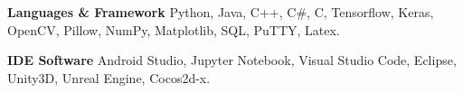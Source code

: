 
\textbf{Languages \& Framework } \hspace{0.2cm} Python, Java, C++, C\#, C, Tensorflow, Keras, OpenCV, Pillow, NumPy, Matplotlib, SQL, PuTTY, Latex.

\textbf{IDE Software} \qquad  \hspace{1.3cm} 	 	Android Studio, Jupyter Notebook, Visual Studio Code, Eclipse, Unity3D, Unreal Engine, Cocos2d-x.
